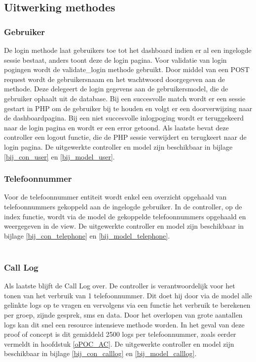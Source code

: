\subsection{Uitwerking methodes}
\subsubsection{Gebruiker}
De login methode laat gebruikers toe tot het dashboard indien er al een ingelogde sessie bestaat, anders toont deze de login pagina. Voor validatie van login pogingen wordt de validate\_login methode gebruikt. Door middel van een POST request wordt de gebruikersnaam en het wachtwoord doorgegeven aan de methode. Deze delegeert de login gegevens aan de gebruikersmodel, die de gebruiker ophaalt uit de database. Bij een succesvolle match wordt er een sessie gestart in PHP om de gebruiker bij te houden en volgt er een doorverwijzing naar de dashboardpagina. Bij een niet succesvolle inlogpoging wordt er teruggekeerd naar de login pagina en wordt er een error getoond. Als laatste bevat deze controller een logout functie, die de PHP sessie verwijdert en terugkeert naar de login pagina. De uitgewerkte controller en model zijn beschikbaar in bijlage \ref{bij_con_user} en \ref{bij_model_user}.\\


\subsubsection{Telefoonnummer}
Voor de telefoonnummer entiteit wordt enkel een overzicht opgehaald van telefoonnummers gekoppeld aan de ingelogde gebruiker. In de controller, op de index functie, wordt via de model de gekoppelde telefoonnummers opgehaald en weergegeven in de view. De uitgewerkte controller en model zijn beschikbaar in bijlage \ref{bij_con_telephone} en \ref{bij_model_telephone}.\\\\


\subsubsection{Call Log}
Als laatste blijft de Call Log over. De controller is verantwoordelijk voor het tonen van het verbruik van 1 telefoonnummer. Dit doet hij door via de model alle gelinkte logs op te vragen en vervolgens via een functie het verbruik te berekenen per groep, zijnde gesprek, sms en data. Door het overlopen van grote aantallen logs kan dit snel een resource intensieve methode worden. In het geval van deze proof of concept is dit gemiddeld 2500 logs per telefoonnummer, zoals eerder vermeldt in hoofdstuk \ref{oPOC_AC}. De uitgewerkte controller en model zijn beschikbaar in bijlage \ref{bij_con_calllog} en \ref{bij_model_calllog}.\\


